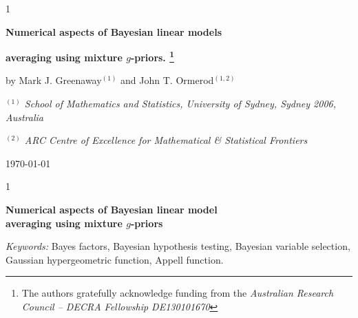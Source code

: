 \documentclass[12pt]{article}
\newcommand{\blind}{1}
\begin{document}
	
	\def\spacingset#1{\renewcommand{\baselinestretch}%
		{#1}\small\normalsize} \spacingset{1}	
	
	
	\blind
	{
		\centerline{\bf \Large Numerical aspects of Bayesian linear models}
		\medskip
		\centerline{\bf \Large averaging
			using mixture $g$-priors. \footnote{ 
				The authors gratefully acknowledge funding from the \textit{Australian Research Council -- DECRA Fellowship  DE130101670}}}
		
		\medskip
		\medskip
		\centerline{\sc by Mark J. Greenaway${}^{(1)}$ and 
			John T. Ormerod${}^{(1,2)}$}
		\medskip
		\centerline{\it ${}^{(1)}$ School of Mathematics and Statistics, University of Sydney, Sydney 2006, Australia}
		\medskip
		\centerline{\it ${}^{(2)}$ ARC Centre of Excellence for Mathematical \& Statistical Frontiers}
		
		\medskip
		\centerline{\today}
	}	
	
	
	\fi
	
	\blind
	{
		\bigskip
		\bigskip
		\bigskip
		\begin{center}
			{\LARGE\bf Numerical aspects of Bayesian linear model \\ averaging
				using mixture $g$-priors}
		\end{center}
		\medskip
	} \fi
	
	\bigskip
	\begin{abstract}
We consider the numerical evaluation of Bayes factors for linear models using different mixture 
$g$-priors. In particular we consider hyperpriors for $g$ leading to closed form expressions for the Bayes factor including  the hyper-$g$ and 
hyper-$g/n$ priors of \cite{Liang2008}, the beta-prime prior of \cite{Maruyama2011}, the robust 
prior of \cite{Bayarri2012}, and the cake prior of \cite{OrmerodEtal2017}. In particular we 
describe how each of these Bayes factor, except for Bayes factor under the hyper-$g/n$ prior, can
evaluated in efficient, accurate and numerically stable manner. We also derive a closed form 
expression for the Bayes factor under the hyper-$g/n$ for which we develop a convenient numerical 
approximation. 
We implement an {\tt R} package for Bayesian linear model averaging,
and discuss some associated computational issues. We illustrate the advantages of our implementation 
over several existing packages on several small datasets.
	\end{abstract}
	
	\noindent%
	{\it Keywords:} Bayes factors, Bayesian hypothesis testing, Bayesian variable selection,
	Gaussian hypergeometric function, Appell function. 
	\vfill
	
\end{document}
